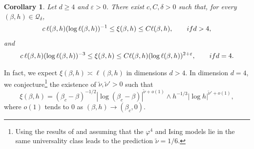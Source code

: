 \documentclass[10pt,a4paper]{amsart}
\numberwithin{equation}{section}
\newtheorem{Coro}[Thm]{Corollary}
\begin{document}
\begin{Coro}\label{coro:correlation length intro}
Let $d\geq 4$ and $\varepsilon>0$. There exist $c,C,\delta>0$ such that, for every $(\beta,h)\in \mathcal Q_\delta$,
\begin{equation}\label{eq:correlation length bounds intro}
    c\,\ell(\beta,h)(\log\ell(\beta,h))^{-1}
    \leq \xi(\beta,h)\leq C\ell(\beta,h), \qquad \textup{if }d>4,
\end{equation}
and 
\begin{equation}\label{eq:correlation length bounds intro bis}
    c\,\ell(\beta,h)(\log\ell(\beta,h))^{-3}
    \leq \xi(\beta,h)\leq C\ell(\beta,h)(\log \ell(\beta,h))^{2+\varepsilon}, \qquad \textup{if }d=4.
\end{equation}
\end{Coro}
In fact, we expect $\xi(\beta,h)\asymp \ell(\beta,h)$ in dimensions $d>4$. In dimension $d=4$, we conjecture\footnote{Using the results of \cite{bauerschmidt2017finite} 
and assuming that the $\varphi^4$ and Ising models lie in the 
same universality class leads to the prediction $\tilde{\nu}=1/6$.} the existence of $\tilde \nu,\tilde \nu'>0$ such that 
\begin{equation}
	\xi(\beta,h)=(\beta_c-\beta)^{-1/2}|\log (\beta_c-\beta)|^{\tilde \nu+o(1)}\wedge h^{-1/3}|\log h|^{\tilde \nu'+o(1)},
	\end{equation}
	where $o(1)$ tends to $0$ as $(\beta,h)\to (\beta_c,0)$. 
	
\end{document}
